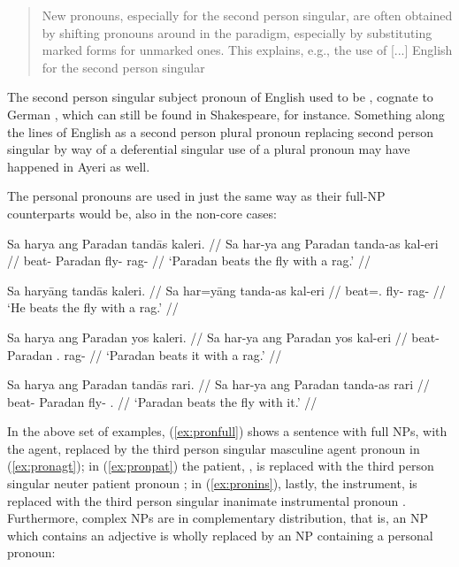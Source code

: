 \blockcquote[42]{lehmann2015}{New pronouns, especially for the second person 
singular, are often obtained by shifting pronouns around in the paradigm, 
especially by substituting marked forms for unmarked ones. This explains, e.g., 
the use of [...] English  for the second person singular}

The second person singular subject pronoun of English used to be , 
cognate to German , which can still be found in Shakespeare, for 
instance. Something along the lines of English  as a second 
person plural pronoun replacing second person singular  by way of a 
deferential singular use of a plural pronoun \citep[you, pron., adj., and 
n.]{oed} may have happened in Ayeri as well.

The personal pronouns are used in just the same way as their full-NP 
counterparts would be, also in the non-core cases:

\pex\label{ex:perspro}
\a\label{ex:pronfull}\begingl
	\gla Sa harya ang Paradan tandās kaleri. //
	\glb Sa har-ya ang Paradan tanda-as kal-eri //
	\glc \AgtT{} beat-\TsgM{} \Aarg{} Paradan fly-\Parg{} rag-\Ins{} //
	\glft `Paradan beats the fly with a rag.' //
\endgl

\a\label{ex:pronagt}\begingl
	\gla Sa haryāng tandās kaleri. //
	\glb Sa har=yāng tanda-as kal-eri //
	\glc \AgtT{} beat=\TsgM{}.\Aarg{} fly-\Parg{} rag-\Ins{} //
	\glft `He beats the fly with a rag.' //
\endgl

\a\label{ex:pronpat}\begingl
	\gla Sa harya ang Paradan yos kaleri. //
	\glb Sa har-ya ang Paradan yos kal-eri //
	\glc \AgtT{} beat-\TsgM{} \Aarg{} Paradan \TsgN{}.\Parg{} rag-\Ins{} //
	\glft `Paradan beats it with a rag.' //
\endgl

\a\label{ex:pronins}\begingl
	\gla Sa harya ang Paradan tandās rari. //
	\glb Sa har-ya ang Paradan tanda-as rari //
	\glc \AgtT{} beat-\TsgM{} \Aarg{} Paradan fly-\Parg{} \TsgI{}.\Ins{} //
	\glft `Paradan beats the fly with it.' //
\endgl

\xe

In the above set of examples, (\ref{ex:pronfull}) shows a sentence with full 
NPs, with the agent,  replaced by the third person 
singular masculine agent pronoun  in (\ref{ex:pronagt}); in 
(\ref{ex:pronpat}) the patient, , is replaced with the 
third person singular neuter patient pronoun ; in 
(\ref{ex:pronins}), lastly, the instrument,  is replaced 
with the third person singular inanimate instrumental pronoun .
Furthermore, complex NPs are in complementary distribution, that is, an NP 
which contains an adjective is wholly replaced by an NP containing a 
personal pronoun:

